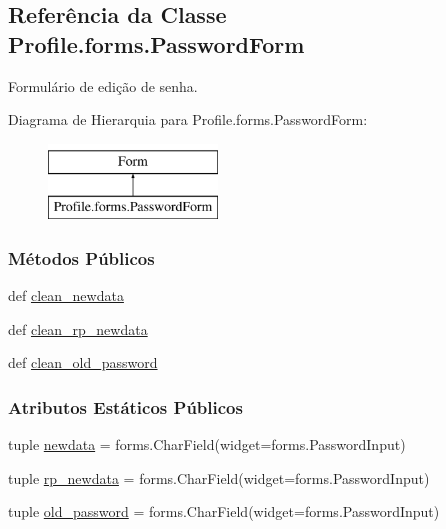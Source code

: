 \hypertarget{classProfile_1_1forms_1_1PasswordForm}{\subsection{Referência da Classe Profile.\-forms.\-Password\-Form}
\label{classProfile_1_1forms_1_1PasswordForm}
}


Formulário de edição de senha.  


Diagrama de Hierarquia para Profile.\-forms.\-Password\-Form\-:\begin{figure}[H]
\begin{center}
\leavevmode
\includegraphics[height=2.000000cm]{df/dbb/classProfile_1_1forms_1_1PasswordForm}
\end{center}
\end{figure}
\subsubsection*{Métodos Públicos}
\begin{DoxyCompactItemize}
\item 
def \hyperlink{classProfile_1_1forms_1_1PasswordForm_ac839e515eabe5449bcc3409b4c0fdf94}{clean\-\_\-newdata}
\item 
def \hyperlink{classProfile_1_1forms_1_1PasswordForm_a85fda85a8da4e4b60f55156e57d53c32}{clean\-\_\-rp\-\_\-newdata}
\item 
def \hyperlink{classProfile_1_1forms_1_1PasswordForm_a9c88c8978bb731ff8c73666b2c742695}{clean\-\_\-old\-\_\-password}
\end{DoxyCompactItemize}
\subsubsection*{Atributos Estáticos Públicos}
\begin{DoxyCompactItemize}
\item 
tuple \hyperlink{classProfile_1_1forms_1_1PasswordForm_a8000a7fa167f74f0cd554f39dd1e3871}{newdata} = forms.\-Char\-Field(widget=forms.\-Password\-Input)
\item 
tuple \hyperlink{classProfile_1_1forms_1_1PasswordForm_a7560db05a7e3dfebdd4e95385192b2ad}{rp\-\_\-newdata} = forms.\-Char\-Field(widget=forms.\-Password\-Input)
\item 
tuple \hyperlink{classProfile_1_1forms_1_1PasswordForm_a71438e4977095210067fd7d2f4cf551c}{old\-\_\-password} = forms.\-Char\-Field(widget=forms.\-Password\-Input)
\end{DoxyCompactItemize}


